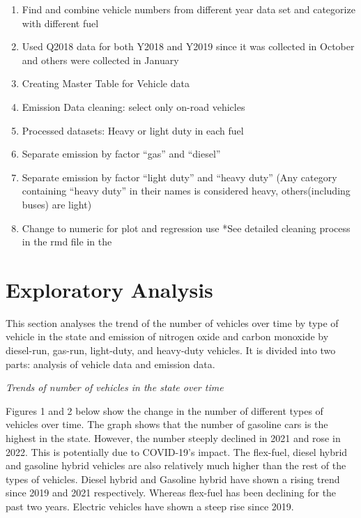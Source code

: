 \documentclass[
  12pt,
]{article}
\providecommand{\tightlist}{%
  \setlength{\itemsep}{0pt}\setlength{\parskip}{0pt}}
\begin{document}
\begin{enumerate}
\def\labelenumi{\arabic{enumi}.}
\tightlist
\item
  Find and combine vehicle numbers from different year data set and
  categorize with different fuel
\item
  Used Q2018 data for both Y2018 and Y2019 since it was collected in
  October and others were collected in January
\item
  Creating Master Table for Vehicle data
\item
  Emission Data cleaning: select only on-road vehicles
\item
  Processed datasets: Heavy or light duty in each fuel
\item
  Separate emission by factor ``gas'' and ``diesel''
\item
  Separate emission by factor ``light duty'' and ``heavy duty'' (Any
  category containing ``heavy duty'' in their names is considered heavy,
  others(including buses) are light)
\item
  Change to numeric for plot and regression use *See detailed cleaning
  process in the rmd file in the
\end{enumerate}

\newpage

\hypertarget{exploratory-analysis}{%
\section{Exploratory Analysis}\label{exploratory-analysis}}

This section analyses the trend of the number of vehicles over time by
type of vehicle in the state and emission of nitrogen oxide and carbon
monoxide by diesel-run, gas-run, light-duty, and heavy-duty vehicles. It
is divided into two parts: analysis of vehicle data and emission data.

\emph{Trends of number of vehicles in the state over time}

Figures 1 and 2 below show the change in the number of different types
of vehicles over time. The graph shows that the number of gasoline cars
is the highest in the state. However, the number steeply declined in
2021 and rose in 2022. This is potentially due to COVID-19's impact. The
flex-fuel, diesel hybrid and gasoline hybrid vehicles are also
relatively much higher than the rest of the types of vehicles. Diesel
hybrid and Gasoline hybrid have shown a rising trend since 2019 and 2021
respectively. Whereas flex-fuel has been declining for the past two
years. Electric vehicles have shown a steep rise since 2019.
\end{document}
